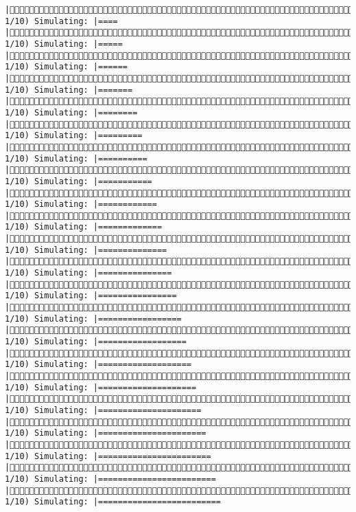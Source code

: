 \documentclass[]{article}
\begin{document}
\begin{verbatim}
|( 1/10) Simulating: |====                                                 |( 1/10) Simulating: |=====                                                |( 1/10) Simulating: |======                                               |( 1/10) Simulating: |=======                                              |( 1/10) Simulating: |========                                             |( 1/10) Simulating: |=========                                            |( 1/10) Simulating: |==========                                           |( 1/10) Simulating: |===========                                          |( 1/10) Simulating: |============                                         |( 1/10) Simulating: |=============                                        |( 1/10) Simulating: |==============                                       |( 1/10) Simulating: |===============                                      |( 1/10) Simulating: |================                                     |( 1/10) Simulating: |=================                                    |( 1/10) Simulating: |==================                                   |( 1/10) Simulating: |===================                                  |( 1/10) Simulating: |====================                                 |( 1/10) Simulating: |=====================                                |( 1/10) Simulating: |======================                               |( 1/10) Simulating: |=======================                              |( 1/10) Simulating: |========================                             |( 1/10) Simulating: |=========================                            
\end{verbatim}
\end{document}
